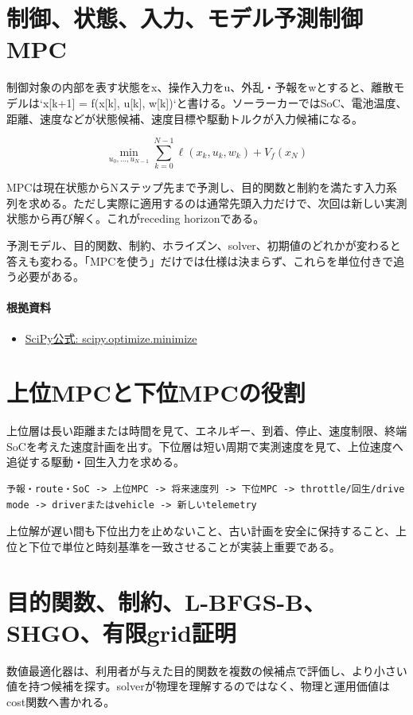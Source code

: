 \documentclass[a4paper,11pt]{article}
\begin{document}
\section{制御、状態、入力、モデル予測制御MPC}
制御対象の内部を表す状態をx、操作入力をu、外乱・予報をwとすると、離散モデルは`x[k+1] = f(x[k], u[k], w[k])`と書ける。ソーラーカーではSoC、電池温度、距離、速度などが状態候補、速度目標や駆動トルクが入力候補になる。


\[
\min_{u_0,\ldots,u_{N-1}} \sum_{k=0}^{N-1}\ell(x_k,u_k,w_k)+V_f(x_N)
\]

MPCは現在状態からNステップ先まで予測し、目的関数と制約を満たす入力系列を求める。ただし実際に適用するのは通常先頭入力だけで、次回は新しい実測状態から再び解く。これがreceding horizonである。


予測モデル、目的関数、制約、ホライズン、solver、初期値のどれかが変わると答えも変わる。「MPCを使う」だけでは仕様は決まらず、これらを単位付きで追う必要がある。

\paragraph{根拠資料}
\begin{itemize}[leftmargin=1.6em]
\item \href{https://docs.scipy.org/doc/scipy/reference/generated/scipy.optimize.minimize.html}{SciPy公式: scipy.optimize.minimize}
\end{itemize}

\section{上位MPCと下位MPCの役割}
上位層は長い距離または時間を見て、エネルギー、到着、停止、速度制限、終端SoCを考えた速度計画を出す。下位層は短い周期で実測速度を見て、上位速度へ追従する駆動・回生入力を求める。


\begin{lstlisting}
予報・route・SoC -> 上位MPC -> 将来速度列 -> 下位MPC -> throttle/回生/drive mode -> driverまたはvehicle -> 新しいtelemetry
\end{lstlisting}


上位解が遅い間も下位出力を止めないこと、古い計画を安全に保持すること、上位と下位で単位と時刻基準を一致させることが実装上重要である。



\section{目的関数、制約、L-BFGS-B、SHGO、有限grid証明}
数値最適化器は、利用者が与えた目的関数を複数の候補点で評価し、より小さい値を持つ候補を探す。solverが物理を理解するのではなく、物理と運用価値はcost関数へ書かれる。
\end{document}
